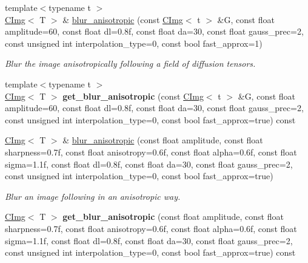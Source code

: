 \begin{DoxyCompactItemize}
\item 
{\footnotesize template$<$typename t $>$ }\\\hyperlink{structcimg__library_1_1CImg}{CImg}$<$ T $>$ \& \hyperlink{structcimg__library_1_1CImg_ab783d1bbecd68bc75b9fb26e944f5523}{blur\_\-anisotropic} (const \hyperlink{structcimg__library_1_1CImg}{CImg}$<$ t $>$ \&G, const float amplitude=60, const float dl=0.8f, const float da=30, const float gauss\_\-prec=2, const unsigned int interpolation\_\-type=0, const bool fast\_\-approx=1)
\begin{DoxyCompactList}\small\item\em Blur the image anisotropically following a field of diffusion tensors. \item\end{DoxyCompactList}\item 
\hypertarget{structcimg__library_1_1CImg_aa1fda7efcb56f2aae4daa68cd580cb62}{
{\footnotesize template$<$typename t $>$ }\\\hyperlink{structcimg__library_1_1CImg}{CImg}$<$ T $>$ {\bfseries get\_\-blur\_\-anisotropic} (const \hyperlink{structcimg__library_1_1CImg}{CImg}$<$ t $>$ \&G, const float amplitude=60, const float dl=0.8f, const float da=30, const float gauss\_\-prec=2, const unsigned int interpolation\_\-type=0, const bool fast\_\-approx=true) const }
\label{structcimg__library_1_1CImg_aa1fda7efcb56f2aae4daa68cd580cb62}

\item 
\hypertarget{structcimg__library_1_1CImg_a33eadcc0b2a964ff6de5eaa44db63ce0}{
\hyperlink{structcimg__library_1_1CImg}{CImg}$<$ T $>$ \& \hyperlink{structcimg__library_1_1CImg_a33eadcc0b2a964ff6de5eaa44db63ce0}{blur\_\-anisotropic} (const float amplitude, const float sharpness=0.7f, const float anisotropy=0.6f, const float alpha=0.6f, const float sigma=1.1f, const float dl=0.8f, const float da=30, const float gauss\_\-prec=2, const unsigned int interpolation\_\-type=0, const bool fast\_\-approx=true)}
\label{structcimg__library_1_1CImg_a33eadcc0b2a964ff6de5eaa44db63ce0}

\begin{DoxyCompactList}\small\item\em Blur an image following in an anisotropic way. \item\end{DoxyCompactList}\item 
\hypertarget{structcimg__library_1_1CImg_a6efb4b9a14d3ec4f834a2d10eba2c268}{
\hyperlink{structcimg__library_1_1CImg}{CImg}$<$ T $>$ {\bfseries get\_\-blur\_\-anisotropic} (const float amplitude, const float sharpness=0.7f, const float anisotropy=0.6f, const float alpha=0.6f, const float sigma=1.1f, const float dl=0.8f, const float da=30, const float gauss\_\-prec=2, const unsigned int interpolation\_\-type=0, const bool fast\_\-approx=true) const }
\label{structcimg__library_1_1CImg_a6efb4b9a14d3ec4f834a2d10eba2c268}


\end{DoxyCompactItemize}

